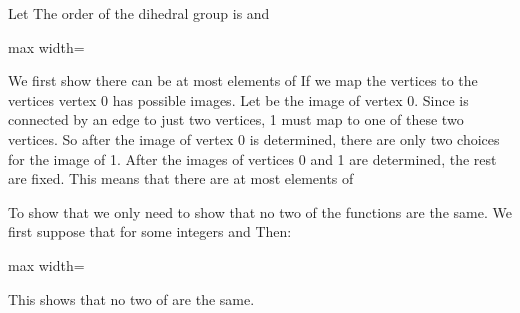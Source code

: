 \documentclass[11pt,oneside]{article}
\begin{document}
\begin{BookBody}
 Let  The order of the dihedral group  is  and

\begin{center}\begin{adjustbox}{max width=\linewidth}\end{adjustbox}\end{center}

 We first show there can be at most  elements of  If we map the vertices  to the vertices  vertex 0 has  possible images. Let  be the image of vertex 0. Since  is connected by an edge to just two vertices, 1 must map to one of these two vertices. So after the image of vertex 0 is determined, there are only two choices for the image of 1. After the images of vertices 0 and 1 are determined, the rest are fixed. This means that there are at most  elements of 

To show that  we only need to show that no two of the functions \BookInline{\iota = }  are the same. We first suppose that  for some integers  and  Then:

\begin{center}\begin{adjustbox}{max width=\linewidth}\end{adjustbox}\end{center}

\noindent This shows that no two of  are the same.


\end{BookBody}
\end{document}
